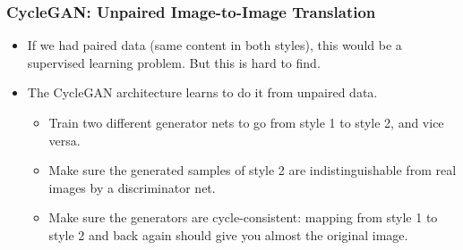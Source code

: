 
\begin{frame}
    \frametitle{CycleGAN: Unpaired Image-to-Image Translation}
    \vspace*{-2cm}
    \begin{itemize}
        \item If we had paired data (same content in both styles), this would be a supervised learning problem. But this is hard to find.
        \item The CycleGAN architecture learns to do it from unpaired data.
              \begin{itemize}
                  \item Train two different generator nets to go from style 1 to style 2, and vice versa.
                  \item Make sure the generated samples of style 2 are indistinguishable from real images by a discriminator net.
                  \item Make sure the generators are cycle-consistent: mapping from style 1 to style 2 and back again should give you almost the original image.
              \end{itemize}
    \end{itemize}
\end{frame}

